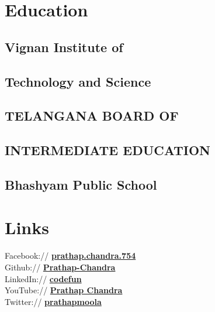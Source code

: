 \documentclass[]{deedy-resume-openfont}
\begin{document}
%
%
\lastupdated

%
%

%
%

\begin{minipage}[t]{0.33\textwidth} 


\section{Education} 
\subsection{Vignan Institute of}
\subsection{Technology and Science}
\sectionsep

\subsection{TELANGANA BOARD OF}
\subsection{INTERMEDIATE EDUCATION}
\sectionsep

\subsection{Bhashyam Public School}
\sectionsep


\section{Links} 
Facebook:// \href{https://facebook/dd}{\bf prathap.chandra.754} \\
Github:// \href{https://github.com/Prathap-Chandra}{\bf Prathap-Chandra} \\
LinkedIn://  \href{https://www.linkedin.com/in/codefun/}{\bf codefun} \\
YouTube://  \href{https://www.youtube.com/channel/UChfA9tIKEAduV_kxuHyAIkA}{\bf Prathap Chandra} \\
Twitter://  \href{https://twitter.com/debarghya_das}{\bf prathapmoola} \\


\end{minipage}
\end{document}

